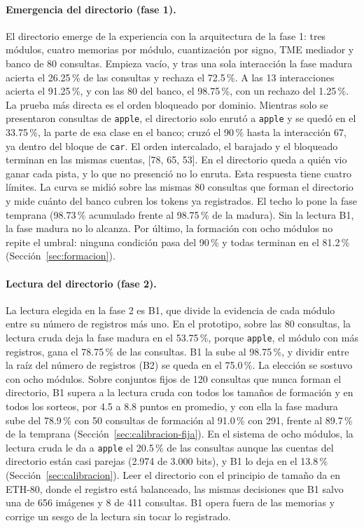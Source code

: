 \paragraph{Emergencia del directorio (fase 1).}
El directorio emerge de la experiencia con la arquitectura de la fase 1: tres módulos,
cuatro memorias por módulo, cuantización por signo, TME mediador y banco de 80 consultas.
Empieza vacío, y tras una sola interacción la fase madura acierta el 26.25\,\% de las
consultas y rechaza el 72.5\,\%.
A las 13 interacciones acierta el 91.25\,\%, y con las 80 del banco, el 98.75\,\%, con
un rechazo del 1.25\,\%.
La prueba más directa es el orden bloqueado por dominio.
Mientras solo se presentaron consultas de \texttt{apple}, el directorio solo enrutó a
\texttt{apple} y se quedó en el 33.75\,\%, la parte de esa clase en el banco; cruzó el
90\,\% hasta la interacción 67, ya dentro del bloque de \texttt{car}.
El orden intercalado, el barajado y el bloqueado terminan en las mismas cuentas,
[78, 65, 53].
En el directorio queda a quién vio ganar cada pista, y lo que no presenció no lo enruta.
Esta respuesta tiene cuatro límites.
La curva se midió sobre las mismas 80 consultas que forman el directorio y mide cuánto
del banco cubren los tokens ya registrados.
El techo lo pone la fase temprana (98.73\,\% acumulado frente al 98.75\,\% de la
madura).
Sin la lectura B1, la fase madura no lo alcanza.
Por último, la formación con ocho módulos no repite el umbral: ninguna condición pasa del 90\,\% y
todas terminan en el 81.2\,\% (Sección~\ref{sec:formacion}).

\paragraph{Lectura del directorio (fase 2).}
La lectura elegida en la fase 2 es B1, que divide la evidencia de cada módulo entre su
número de registros más uno.
En el prototipo, sobre las 80 consultas, la lectura cruda deja la fase madura en el
53.75\,\%, porque \texttt{apple}, el módulo con más registros, gana el 78.75\,\% de las
consultas.
B1 la sube al 98.75\,\%, y dividir entre la raíz del número de registros (B2) se queda en
el 75.0\,\%.
La elección se sostuvo con ocho módulos.
Sobre conjuntos fijos de 120 consultas que nunca forman el directorio, B1 supera a la
lectura cruda con todos los tamaños de formación y en todos los sorteos, por 4.5 a 8.8
puntos en promedio, y con ella la fase madura sube del 78.9\,\% con 50 consultas de
formación al 91.0\,\% con 291, frente al 89.7\,\% de la temprana
(Sección~\ref{sec:calibracion-fija}).
En el sistema de ocho módulos, la lectura cruda le da a \texttt{apple} el 20.5\,\% de las
consultas aunque las cuentas del directorio están casi parejas (2.974 de 3.000 bits), y B1 lo deja
en el 13.8\,\% (Sección~\ref{sec:calibracion}).
Leer el directorio con el principio de tamaño da en ETH-80, donde el registro está
balanceado, las mismas decisiones que B1 salvo una de 656 imágenes y 8 de 411 consultas.
B1 opera fuera de las memorias y corrige un sesgo de la lectura sin tocar lo registrado.

